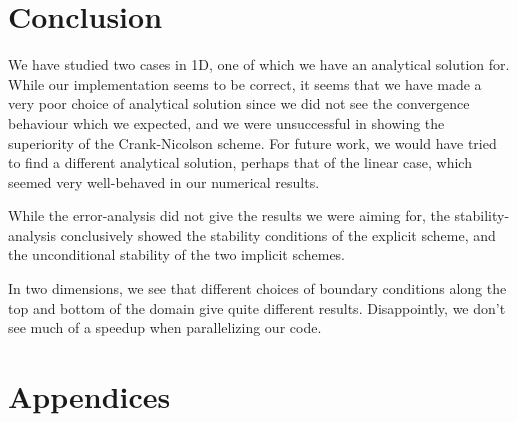 \documentclass[10pt,a4paper]{article}
\begin{document}
\section{Conclusion}
We have studied two cases in 1D, one of which we have an analytical solution for. While our implementation seems to be correct, it seems that we have made a very poor choice of analytical solution since we did not see the convergence behaviour which we expected, and we were unsuccessful in showing the superiority of the Crank-Nicolson scheme. For future work, we would have tried to find a different analytical solution, perhaps that of the linear case, which seemed very well-behaved in our numerical results.

While the error-analysis did not give the results we were aiming for, the stability-analysis conclusively showed the stability conditions of the explicit scheme, and the unconditional stability of the two implicit schemes.

In two dimensions, we see that different choices of boundary conditions along the top and bottom of the domain give quite different results. Disappointly, we don't see much of a speedup when parallelizing our code.



{}

\newpage
\appendix
\section*{\Huge{Appendices}}




\end{document}
